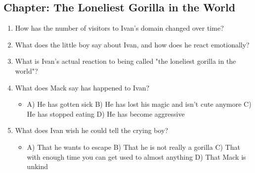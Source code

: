 \documentclass[11pt]{article}
\begin{document}
\subsection*{Chapter: The Loneliest Gorilla in the World}
\begin{enumerate}
  \item How has the number of visitors to Ivan's domain changed over time?
  \vspace{0.5in}
  \item What does the little boy say about Ivan, and how does he react emotionally?
  \vspace{0.5in}
  \item What is Ivan's actual reaction to being called "the loneliest gorilla in the world"?
  \vspace{0.5in}
  \item What does Mack say has happened to Ivan?
  \begin{itemize}\setlength\itemsep{0pt}
    \item[] A) He has gotten sick \quad B) He has lost his magic and isn't cute anymore \quad C) He has stopped eating \quad D) He has become aggressive
  \end{itemize}
  \item What does Ivan wish he could tell the crying boy?
  \begin{itemize}\setlength\itemsep{0pt}
    \item[] A) That he wants to escape \quad B) That he is not really a gorilla \quad C) That with enough time you can get used to almost anything \quad D) That Mack is unkind
  \end{itemize}
\end{enumerate}
\end{document}

